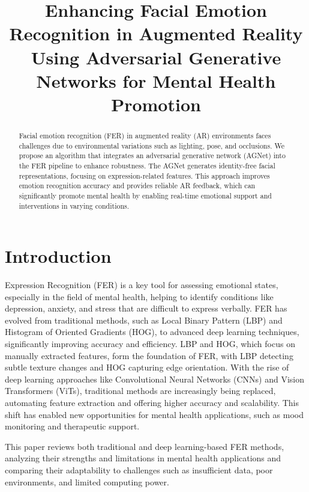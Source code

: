 \documentclass[lettersize,journal]{IEEEtran}
\begin{document}
\title{Enhancing Facial Emotion Recognition in Augmented Reality Using Adversarial Generative Networks for Mental Health Promotion}



\maketitle

\begin{abstract}
Facial emotion recognition (FER) in augmented reality (AR) environments faces challenges due to environmental variations such as lighting, pose, and occlusions. We propose an algorithm that integrates an adversarial generative network (AGNet) into the FER pipeline to enhance robustness. The AGNet generates identity-free facial representations, focusing on expression-related features. This approach improves emotion recognition accuracy and provides reliable AR feedback, which can significantly promote mental health by enabling real-time emotional support and interventions in varying conditions.
\end{abstract}



\section{Introduction}
 Expression Recognition (FER) is a key tool for assessing emotional states, especially in the field of mental health, helping to identify conditions like depression, anxiety,  and stress that are difficult to express verbally.  FER has evolved from traditional methods,  such as Local Binary Pattern (LBP) and Histogram of Oriented Gradients (HOG), to advanced deep learning techniques,  significantly improving accuracy and efficiency.  LBP and HOG, which focus on manually extracted features,  form the foundation of FER,  with LBP detecting subtle texture changes and HOG capturing edge orientation.  With the rise of deep learning approaches  like Convolutional Neural Networks (CNNs) and Vision Transformers (ViTs),  traditional methods are increasingly being replaced,  automating feature extraction and offering higher accuracy and scalability.  This shift has enabled new opportunities  for mental health applications,  such as mood monitoring and therapeutic support.  

This paper reviews both traditional and deep learning-based FER  methods,  analyzing their strengths and limitations in mental health applications and comparing their adaptability to challenges  such as insufficient data, poor environments, and limited computing power.
\end{document}
